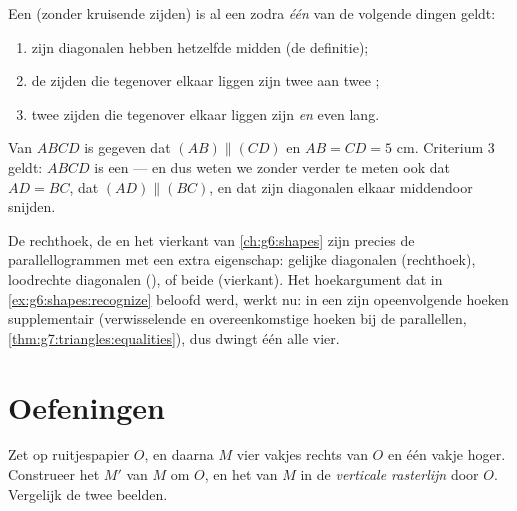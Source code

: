 \begin{theorem}\label{thm:g7:central:recognize}
Een  (zonder kruisende zijden) is al een  zodra \emph{één} van
de volgende dingen geldt:
\begin{enumerate}
  \item zijn diagonalen hebben hetzelfde midden (de definitie);
  \item de zijden die tegenover elkaar liggen zijn twee aan twee ;
  \item twee zijden die tegenover elkaar liggen zijn  \emph{en} even lang.
\end{enumerate}
\end{theorem}
\admitted

\begin{example}\label{ex:g7:central:recognize}
Van $ABCD$ is gegeven dat $(AB) \parallel (CD)$ en $AB = CD = 5$ cm. Criterium 3
geldt: $ABCD$ is een  --- en dus weten we zonder verder te meten ook
dat $AD = BC$, dat $(AD) \parallel (BC)$, en dat zijn diagonalen elkaar middendoor
snijden.
\end{example}

\begin{remark}
De rechthoek, de  en het vierkant van \cref{ch:g6:shapes} zijn precies de
parallellogrammen met een extra eigenschap: gelijke diagonalen (rechthoek),
loodrechte diagonalen (), of beide (vierkant). Het hoekargument dat in
\cref{ex:g6:shapes:recognize} beloofd werd, werkt nu: in een  zijn
opeenvolgende hoeken supplementair (verwisselende en overeenkomstige hoeken bij de
parallellen, \cref{thm:g7:triangles:equalities}), dus dwingt één  alle
vier.
\end{remark}

\section{Oefeningen}

\begin{exercise}[$\star$]\label{exo:g7:central:1}
Zet op ruitjespapier $O$, en daarna $M$ vier vakjes rechts van $O$ en één vakje
hoger. Construeer het  $M'$ van $M$ om $O$, en het  van $M$
in de \emph{verticale rasterlijn} door $O$. Vergelijk de twee beelden.
\end{exercise}


